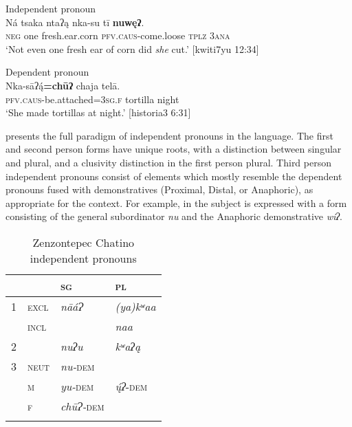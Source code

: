 \documentclass[output=paper]{../langscibook}
\begin{document}
\ea\label{ex:campbell:20}
{Independent pronoun}\\
\gll Ná  tsaka  ntaʔą  nka-su  tī  \textbf{nuwęʔ}.\\
     \textsc{neg}  one  fresh.ear.corn  \textsc{pfv.caus-}come.loose  \textsc{tplz}  3\textsc{ana}\\
\glt ‘Not even one fresh ear of corn did \textit{she} cut.’ [kwiti7yu 12:34]
\z

\ea\label{ex:campbell:21}
{Dependent pronoun}\\
\gll Nka-sāʔ\'{ą}\textbf{=chūʔ}  chaja  telā.\\
     \textsc{pfv.caus-}be.attached=\textsc{3sg.f}  tortilla  night\\
\glt ‘She made tortillas at night.’ [historia3 6:31]
\z


 presents the full paradigm of independent pronouns in the language. The first and second person forms have unique roots, with a distinction between singular and plural, and a clusivity distinction in the first person plural. Third person independent pronouns consist of elements which mostly resemble the dependent pronouns fused with demonstratives (Proximal, Distal, or Anaphoric), as appropriate for the context. For example, in  the subject is expressed with a form consisting of the general subordinator \textit{nu} and the Anaphoric demonstrative \textit{wiʔ}.


\begin{table}
\caption{Zenzontepec Chatino independent pronouns}
\label{tab:campbell:1}

\begin{tabularx}{0.4\textwidth}{p{0.3cm}p{0.7cm}XX} 
\lsptoprule
&  & {\bfseries \textmd{\textsc{sg}}} & {\bfseries \textmd{\textsc{pl}}}\\
\hline
1 & \textsc{excl} & \textit{nāáɁ} & \textit{(ya)kʷaa}\\
& \textsc{incl} &  & \textit{naa}\\
2 &  & \textit{nuʔu} & \textit{kʷaʔą}\\
3 & \textsc{neut} & \textit{nu-}\textsc{dem} & \\
& \textsc{m} & \textit{yu-}\textsc{dem} & \textit{ų́ʔ}{}-\textsc{dem}\\
& \textsc{f} & \textit{chūɁ-}\textsc{dem} & \\
\lspbottomrule
\end{tabularx}
\end{table}
\end{document}
